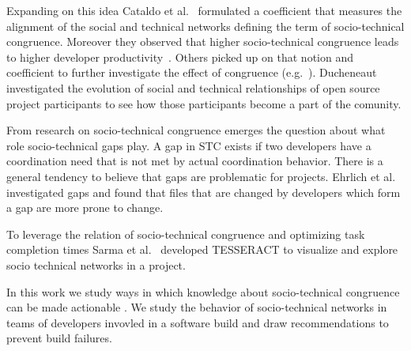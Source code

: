 \documentclass{sig-alternate}
\begin{document}
Expanding on this idea Cataldo et al.~\cite{cataldo:cscw:2006} formulated a coefficient that measures the alignment of the social and technical networks defining the term of socio-technical congruence.
Moreover they observed that higher socio-technical congruence leads to higher developer productivity~\cite{cataldo:cscw:2006}.
Others picked up on that notion and coefficient to further investigate the effect of congruence (e.g.~\cite{valetto:msr:2007}).
Ducheneaut~\cite{ducheneaut:cscw:2005} investigated the evolution of social
and technical relationships of open source project participants to see how those participants become a part of the comunity.

From research on socio-technical congruence emerges the question about what
role socio-technical gaps play. A gap in STC exists if two developers have a
coordination need that is not met by actual coordination behavior. There is a
general tendency to believe that gaps are problematic for projects. Ehrlich et
al.~\cite{ehrlich:stc:2008} investigated gaps and found that files that are changed by developers which form a gap are more prone to change.

To leverage the relation of socio-technical congruence and optimizing task
completion times Sarma et al.~\cite{sarma:icse:2009} developed TESSERACT to
visualize and explore socio technical networks in a project. 



In this work we study ways in which knowledge about socio-technical congruence
can be made actionable \cite{schroeter:rsse:2008}. We study the behavior of
socio-technical networks in teams of developers invovled in a software build
and draw recommendations to prevent build failures.
\end{document}
